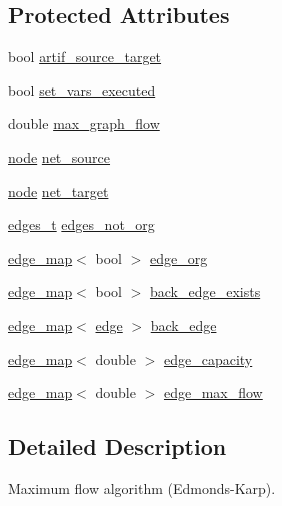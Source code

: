 \subsection*{Protected Attributes}
\begin{DoxyCompactItemize}
\item 
bool \mbox{\hyperlink{classmaxflow__ff_a1ec31e7053722875a2e90659f79396a3}{artif\+\_\+source\+\_\+target}}
\item 
bool \mbox{\hyperlink{classmaxflow__ff_a2551a00303d9b81ccc6b3d1f575d7956}{set\+\_\+vars\+\_\+executed}}
\item 
double \mbox{\hyperlink{classmaxflow__ff_a7a2f530f9c95b6f37f4c349427a0f9bb}{max\+\_\+graph\+\_\+flow}}
\item 
\mbox{\hyperlink{classnode}{node}} \mbox{\hyperlink{classmaxflow__ff_a2e4cc02ce8c9d929f2896525c686d6c1}{net\+\_\+source}}
\item 
\mbox{\hyperlink{classnode}{node}} \mbox{\hyperlink{classmaxflow__ff_a94d5db73364cf5824ec3d3d530b57319}{net\+\_\+target}}
\item 
\mbox{\hyperlink{edge_8h_a8f9587479bda6cf612c103494b3858e3}{edges\+\_\+t}} \mbox{\hyperlink{classmaxflow__ff_a489798941deb8122a385684c7d416f92}{edges\+\_\+not\+\_\+org}}
\item 
\mbox{\hyperlink{classedge__map}{edge\+\_\+map}}$<$ bool $>$ \mbox{\hyperlink{classmaxflow__ff_aa9fd46b8da1a67678b132a17e7a41c91}{edge\+\_\+org}}
\item 
\mbox{\hyperlink{classedge__map}{edge\+\_\+map}}$<$ bool $>$ \mbox{\hyperlink{classmaxflow__ff_a686006593b17dfd3ad9a5e02b1ad9e92}{back\+\_\+edge\+\_\+exists}}
\item 
\mbox{\hyperlink{classedge__map}{edge\+\_\+map}}$<$ \mbox{\hyperlink{classedge}{edge}} $>$ \mbox{\hyperlink{classmaxflow__ff_abceef8f9ee5acf7a992301de6d0c80de}{back\+\_\+edge}}
\item 
\mbox{\hyperlink{classedge__map}{edge\+\_\+map}}$<$ double $>$ \mbox{\hyperlink{classmaxflow__ff_a5b38943e093c77a57eb70f1a4190b8a6}{edge\+\_\+capacity}}
\item 
\mbox{\hyperlink{classedge__map}{edge\+\_\+map}}$<$ double $>$ \mbox{\hyperlink{classmaxflow__ff_a669f36f1fae2dd0f6cfc0172e3ae0e8f}{edge\+\_\+max\+\_\+flow}}
\end{DoxyCompactItemize}


\subsection{Detailed Description}
Maximum flow algorithm (Edmonds-\/\+Karp). 

